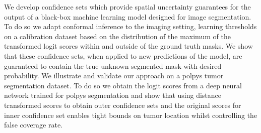 We develop confidence sets which provide spatial uncertainty guarantees for the output of a black-box machine learning model designed for image segmentation. To do so we adapt conformal inference to the imaging setting, learning thresholds  on a calibration dataset based on the distribution of the maximum of the transformed logit scores within and outside of the ground truth masks. We show that these confidence sets, when applied to new predictions of the model, are guaranteed to contain the true unknown segmented mask with desired probability. We illustrate and validate our approach on a polpys tumor segmentation dataset. To do so we obtain the logit scores from a deep neural network trained for polpys segmentation and show that using distance transformed scores to obtain outer confidence sets and the original scores for inner confidence set enables tight bounds on tumor location whilst controlling the false coverage rate. 